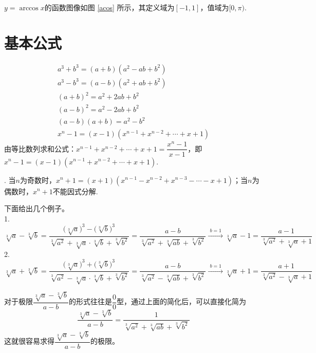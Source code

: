 $y = \arccos x$的函数图像如图 \ref{acos} 所示，其定义域为$[-1, 1]$，值域为$[0, \pi)$.

\section{基本公式}
\vspace*{-2em}
\begin{align}
	\boxed{a^3 + b^3 = (a + b)(a^2 - ab + b^2)}\quad \quad  \\[0.5em]
	\boxed{a^3 - b^3 = (a - b)(a^2 + ab + b^2)}\quad \quad \\[0.5em]
	\boxed{(a + b)^2 = a^2 + 2ab + b^2 }\quad \quad \quad\,\,\\[0.5em]
	\boxed{(a - b)^2 = a^2 - 2ab + b^2 }\quad \quad \quad\,\,\\[0.5em]
	\boxed{(a-b)(a+b) = a^2 - b^2}\quad \quad \quad\,\,\\[0.5em]
	\boxed{x^n - 1 = (x - 1)(x^{n-1} + x^{n-2} + \cdots + x + 1)}
\end{align}
\proof 由等比数列求和公式：$x^{n-1} + x^{n-2} + \cdots + x + 1 = \dfrac{x^n - 1}{x -1}$，即$x^n - 1 = (x - 1)(x^{n-1} + x^{n-2} + \cdots + x + 1).$

. 当$n$为奇数时，$x^n + 1 = (x+1)(x^{n-1}- x^{n-2} + x^{n-3} - \cdots - x + 1)$；当$n$为偶数时，$x^n + 1$不能因式分解.


下面给出几个例子。\\[1em]
1. $\displaystyle \sqrt[3]{a} - \sqrt[3]{b} = \dfrac{\big(\sqrt[3]{a} \big)^3 - \big(\sqrt[3]{b} \big)^3}{\sqrt[3]{a^2} + \sqrt[3]{a}\cdot\sqrt[3]{b} + \sqrt[3]{b^2}} = \dfrac{a-b}{\sqrt[3]{a^2} + \sqrt[3]{ab} + \sqrt[3]{b^2}} \xrightarrow{\textstyle \,\, b = 1 \,\,} \sqrt[3]{a} - 1 = \dfrac{a-1}{\sqrt[3]{a^2} + \sqrt[3]{a} + 1}$\\[0.5em]
2. $\displaystyle \sqrt[3]{a} + \sqrt[3]{b} = \dfrac{\big(\sqrt[3]{a} \big)^3 + \big(\sqrt[3]{b} \big)^3}{\sqrt[3]{a^2} - \sqrt[3]{a}\cdot\sqrt[3]{b} + \sqrt[3]{b^2}} = \dfrac{a-b}{\sqrt[3]{a^2} -\sqrt[3]{ab} + \sqrt[3]{b^2}} \xrightarrow{\textstyle \,\, b = 1 \,\,} \sqrt[3]{a} + 1 = \dfrac{a+1}{\sqrt[3]{a^2} - \sqrt[3]{a} + 1}$\\[1em]
\par 对于极限$\displaystyle \dfrac{\sqrt[3]{a} - \sqrt[3]{b}}{a - b}$的形式往往是$\dfrac{0}{0}$型，通过上面的简化后，可以直接化简为
$$
\dfrac{\sqrt[3]{a} - \sqrt[3]{b}}{a - b} = \dfrac{1}{\sqrt[3]{a^2} + \sqrt[3]{ab} + \sqrt[3]{b^2}}
$$
这就很容易求得$\displaystyle \dfrac{\sqrt[3]{a} - \sqrt[3]{b}}{a - b}$的极限。

